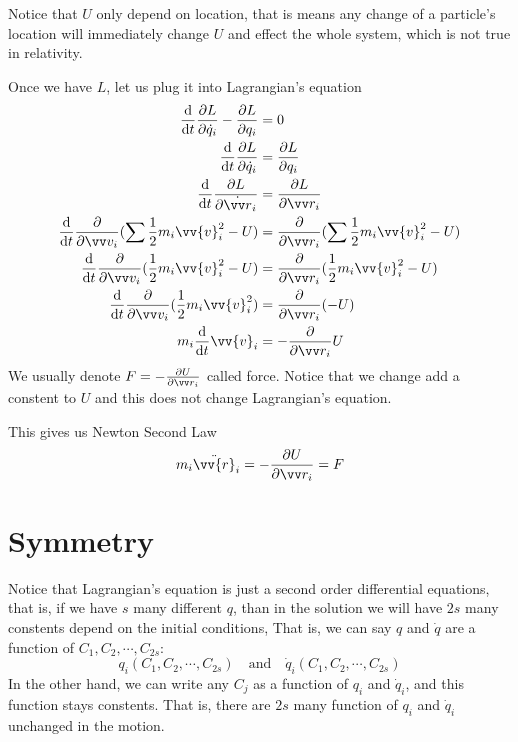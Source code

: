 \documentclass{article}
\newcommand{\de}{\mathrm{d}}
\begin{document}
Notice that $U$ only depend on location, that is means any change of a particle's location will immediately change $U$ and effect the whole system, which is not true in relativity.

Once we have $L$, let us plug it into Lagrangian's equation
\begin{align*}
    \frac{\de}{\de t} \frac{\partial L}{\partial \dot{q}_i} - \frac{\partial L}{\partial q_i} &= 0 \\
    \frac{\de}{\de t} \frac{\partial L}{\partial \dot{q}_i} &= \frac{\partial L}{\partial q_i} \\
    \frac{\de}{\de t} \frac{\partial L}{\partial \dot{\vv r}_i} &= \frac{\partial L}{\partial \vv r_i} \\
    \frac{\de}{\de t} \frac{\partial }{\partial \vv v_i}(\sum \frac{1}{2} m_i \vv{v}^2_i- U) &= \frac{\partial }{\partial \vv r_i} (\sum \frac{1}{2} m_i \vv{v}^2_i- U) \\
    \frac{\de}{\de t} \frac{\partial }{\partial \vv v_i}(\frac{1}{2} m_i \vv{v}^2_i- U) &= \frac{\partial }{\partial \vv r_i} (\frac{1}{2} m_i \vv{v}^2_i- U) \\
    \frac{\de}{\de t} \frac{\partial }{\partial \vv v_i}(\frac{1}{2} m_i \vv{v}^2_i) &= \frac{\partial }{\partial \vv r_i} (- U) \\
    m_i \frac{\de}{\de t} \vv{v}_i &= -\frac{\partial }{\partial \vv r_i} U 
\end{align*}
We usually denote $F = -\frac{\partial U}{\partial \vv r_i}$ called force. Notice that we change add a constent to $U$ and this does not change Lagrangian's equation.

This gives us Newton Second Law
\[
m_i \ddot{\vv{r}}_i = -\frac{\partial U}{\partial \vv r_i} = F
\]

\section{Symmetry}
Notice that Lagrangian's equation is just a second order differential equations, that is, if we have $s$ many different $q$, than in the solution we will have $2s$ many constents depend on the initial conditions, That is, we can say $q$ and $\dot q$ are a function of $C_1, C_2, \cdots, C_{2s}$:
\[
q_i (C_1, C_2, \cdots, C_{2s}) \quad \text{and} \quad \dot{q}_i (C_1, C_2, \cdots, C_{2s})
\]
In the other hand, we can write any $C_j$ as a function of $q_i$ and $\dot q_i$, and this function stays constents. That is, there are $2s$ many function of $q_i$ and $\dot q_i$ unchanged in the motion.
\end{document}
